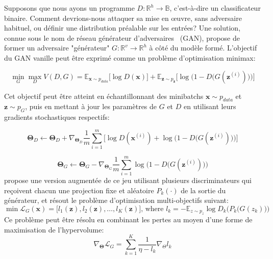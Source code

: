 Supposons que nous ayons un programme $D: \mathbb{R}^h\rightarrow\mathbb{B}$, c'est-à-dire un classificateur binaire. Comment devrions-nous attaquer sa mise en œuvre, sans adversaire habituel, ou définir une distribution préalable sur les entrées? Une solution, connue sous le nom de réseau générateur d'adversaires~\citep{goodfellow2014gan} (GAN), propose de former un adversaire "générateur" $G: \mathbb{R}^v\rightarrow\mathbb{R}^h$ à côté du modèle formé. L'objectif du GAN vanille peut être exprimé comme un problème d'optimisation minimax:

\begin{equation}
\min_G \max_D V(D, G) = \mathbb{E}_{\mathbf x \sim p_{data}}\big[\log D(\mathbf x)\big] + \mathbb{E}_{\mathbf z \sim p_{\mathbf z}}\Big[\log\Big(1 - D\big(G(\mathbf z^{(i)})\big)\Big)\Big]
\end{equation}

Cet objectif peut être atteint en échantillonnant des minibatchs $\mathbf x \sim p_{data}$ et $\mathbf z \sim p_{G}$, puis en mettant à jour les paramètres de $G$ et $D$ en utilisant leurs gradients stochastiques respectifs:

\begin{equation}
\bm\Theta_D \leftarrow \bm\Theta_D + \nabla_{\bm\Theta_D}\frac{1}{m}\sum_{i=1}^m\Big[\log D(\mathbf x^{(i)}) + \log\Big(1 - D\big(G(\mathbf z^{(i)})\big)\Big)\Big]
\end{equation}

\begin{equation}
\bm\Theta_G \leftarrow \bm\Theta_G - \nabla_{\bm\Theta_G}\frac{1}{m}\sum_{i=1}^m \log\Big(1 - D\big(G(\mathbf z^{(i)})\big)\Big)
\end{equation}
%
\citet{albuquerque2019hgan} propose une version augmentée de ce jeu utilisant plusieurs discriminateurs qui reçoivent chacun une projection fixe et aléatoire $P_k(\cdot)$ de la sortie du générateur, et résout le problème d'optimisation multi-objectifs suivant:
%
\begin{equation} \label{eq:moo_spec}
\min \mathbf{\mathcal{L}}_G(\mathbf x) = \big[l_1(\mathbf z), l_2(\mathbf z), \ldots, l_K(\mathbf z)\big] \text{, where } l_k = -\mathbb E_{z \sim p_z} \log D_k\Big(P_k\big(G(z_k)\big)\Big)
\end{equation}
%
Ce problème peut être résolu en combinant les pertes au moyen d'une forme de maximisation de l'hypervolume:
%
\begin{equation}
\nabla_{\bm\Theta} \mathcal{L}_G = \sum_{k=1}^K \frac{1}{\eta - l_k}\nabla_\Theta l_k
\end{equation}

